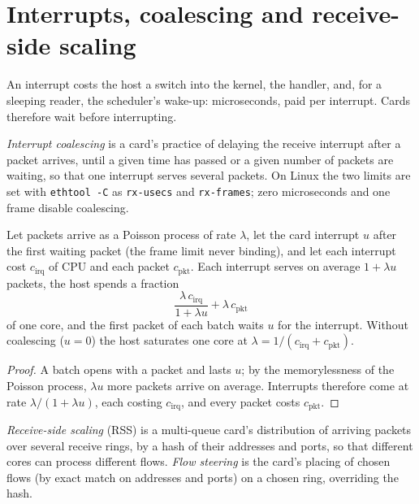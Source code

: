 \section{Interrupts, coalescing and receive-side scaling}

An interrupt costs the host a switch into the kernel, the handler, and, for a sleeping reader, the scheduler's wake-up: microseconds,
paid per interrupt. Cards therefore wait before interrupting.

\begin{definition}\label{def:nw:network-cards-and-kernel-bypass:coalesce}
\emph{Interrupt coalescing} is a card's practice of delaying the receive interrupt after a packet
arrives, until a given time has passed or a given number of packets are waiting, so that one interrupt serves several packets.
On Linux the two limits are set with \texttt{ethtool -C} as \texttt{rx-usecs} and \texttt{rx-frames}; zero microseconds and one frame
disable coalescing.
\end{definition}

\begin{proposition}\label{prop:nw:network-cards-and-kernel-bypass:coalesce}
Let packets arrive as a Poisson process of rate $\lambda$, let the card interrupt $u$ after the first waiting packet (the frame limit
never binding), and let each interrupt cost $c_{\mathrm{irq}}$ of CPU and each packet $c_{\mathrm{pkt}}$. Each interrupt serves on
average $1 + \lambda u$ packets, the host spends a fraction
\[
  \frac{\lambda\, c_{\mathrm{irq}}}{1 + \lambda u} + \lambda\, c_{\mathrm{pkt}}
\]
of one core, and the first packet of each batch waits $u$ for the interrupt. Without coalescing ($u = 0$) the host saturates one core
at $\lambda = 1/(c_{\mathrm{irq}} + c_{\mathrm{pkt}})$.
\end{proposition}

\begin{proof}
A batch opens with a packet and lasts $u$; by the memorylessness of the Poisson process, $\lambda u$ more packets arrive on
average. Interrupts therefore come at rate $\lambda/(1+\lambda u)$, each costing $c_{\mathrm{irq}}$, and every packet costs
$c_{\mathrm{pkt}}$.
\end{proof}

\begin{definition}\label{def:nw:network-cards-and-kernel-bypass:rss}
\emph{Receive-side scaling} (RSS) is a multi-queue card's distribution of arriving packets over several
receive rings, by a hash of their addresses and ports, so that different cores can process different flows. \emph{Flow
steering} is the card's placing of chosen flows (by exact match on addresses and ports) on a chosen ring,
overriding the hash.
\end{definition}

